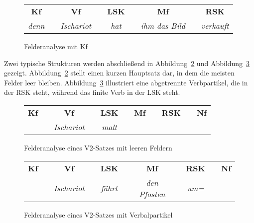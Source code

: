 \begin{figure}
  \centering
  \begin{tabular}{cp{0.1em}cp{0.1em}cp{0.1em}cp{0.1em}c}
    \textbf{Kf} && \textbf{Vf} && \textbf{LSK} && \textbf{Mf} && \textbf{RSK} \\
    \cmidrule{1-1}\cmidrule{3-3}\cmidrule{5-5}\cmidrule{7-7}\cmidrule{9-9}
    \textit{denn} && \textit{Ischariot} && \textit{hat} && \textit{ihm das Bild} && \textit{verkauft} \\
  \end{tabular}
  \caption{Felderanalyse mit Kf}
  \label{fig:konnektorfeld}
\end{figure}

Zwei typische Strukturen werden abschließend in Abbildung~\ref{fig:leerefelder} und Abbildung~\ref{fig:verbalpartikelalleinzuhaus} gezeigt.
Abbildung~\ref{fig:leerefelder} stellt einen kurzen Hauptsatz dar, in dem die meisten Felder leer bleiben.
Abbildung~\ref{fig:verbalpartikelalleinzuhaus} illustriert eine abgetrennte Verbpartikel, die in der RSK steht, während das finite Verb in der LSK steht.

\begin{figure}
  \centering
  \begin{tabular}{cp{0.1em}cp{0.1em}cp{0.1em}cp{0.1em}cp{0.1em}c}
    \textbf{Kf} && \textbf{Vf} && \textbf{LSK} && \textbf{Mf} && \textbf{RSK} && \textbf{Nf} \\
    \cmidrule{1-1}\cmidrule{3-3}\cmidrule{5-5}\cmidrule{7-7}\cmidrule{9-9}
    && \textit{Ischariot} && \textit{malt} &&&&&& \\
  \end{tabular}
  \caption{Felderanalyse eines V2-Satzes mit leeren Feldern}
  \label{fig:leerefelder}
\end{figure}

\begin{figure}
  \centering
  \begin{tabular}{cp{0.1em}cp{0.1em}cp{0.1em}cp{0.1em}cp{0.1em}c}
    \textbf{Kf} && \textbf{Vf} && \textbf{LSK} && \textbf{Mf} && \textbf{RSK} && \textbf{Nf} \\
    \cmidrule{1-1}\cmidrule{3-3}\cmidrule{5-5}\cmidrule{7-7}\cmidrule{9-9}\cmidrule{11-11}
    && \textit{Ischariot} && \textit{fährt} && \textit{den Pfosten} && \textit{um=} & \\
  \end{tabular}
  \caption{Felderanalyse eines V2-Satzes mit Verbalpartikel}
  \label{fig:verbalpartikelalleinzuhaus}
\end{figure}

